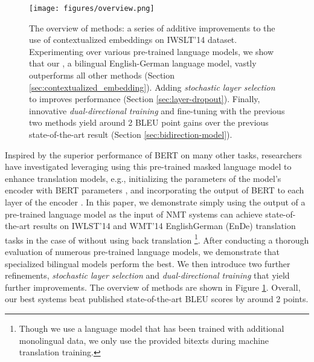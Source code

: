 \documentclass[11pt]{article}
\begin{document}
\begin{figure}[ht]
    \centering
    \texttt{[image: figures/overview.png]}
    \caption{The overview of methods: a series of additive improvements to the use of contextualized embeddings on IWSLT'14 dataset. Experimenting over various pre-trained language models, we show that our , a bilingual English-German language model, vastly outperforms all other methods (Section \ref{sec:contextualized_embedding}). Adding \emph{stochastic layer selection} to  improves performance (Section \ref{sec:layer-dropout}). Finally, innovative \emph{dual-directional training} and fine-tuning with the previous two methods yield around 2 BLEU point gains over the previous state-of-the-art result \citep{wu-etal-2021-unidrop} (Section \ref{sec:bidirection-model}).}
    \label{fig:intro}
\end{figure}

Inspired by the superior performance of \textsc{BERT} on many other tasks, researchers have investigated leveraging using this pre-trained masked language model to enhance translation models, e.g., initializing the parameters of the model's encoder with \textsc{BERT} parameters \citep{rothe-etal-2020-leveraging}, and incorporating the output of \textsc{BERT} to each layer of the encoder \citep{Zhu2020Incorporating, weng2020acquiring}. In this paper, we demonstrate simply using the output of a pre-trained language model as the input of NMT systems can achieve state-of-the-art results on IWLST'14 \citep{cettolo2014report} and WMT'14 \citep{bojar2014findings} EnglishGerman (EnDe) translation tasks in the case of without using back translation \citep{sennrich2016improving,edunov2018understanding}\footnote{Though we use a language model that has been trained with additional monolingual data, we only use the provided bitexts during machine translation training.}. After conducting a thorough evaluation of numerous pre-trained language models, we demonstrate that specialized bilingual models perform the best. We then introduce two further refinements,  \emph{stochastic layer selection} and \emph{dual-directional training} that yield further improvements. The overview of methods are shown in Figure \ref{fig:intro}. Overall, our best systems beat published state-of-the-art BLEU scores by around 2 points.
\end{document}
